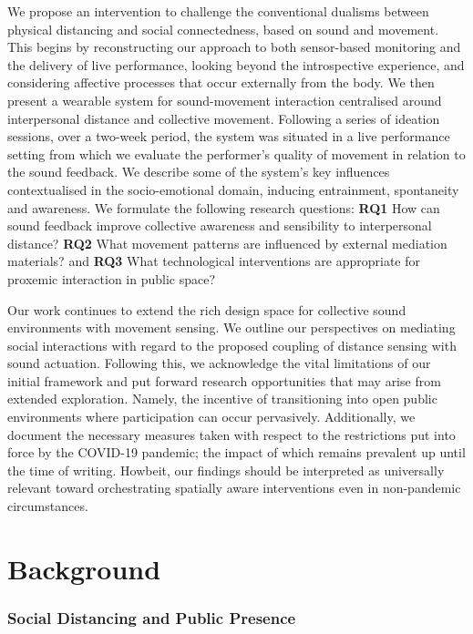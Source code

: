 We propose an intervention to challenge the conventional dualisms between physical distancing and social connectedness, based on sound and movement. This begins by reconstructing our approach to both sensor-based monitoring and the delivery of live performance, looking beyond the introspective experience, and considering affective processes that occur externally from the body. We then present a wearable system for sound-movement interaction centralised around interpersonal distance and collective movement. Following a series of ideation sessions, over a two-week period, the system was situated in a live performance setting from which we evaluate the performer's quality of movement in relation to the sound feedback. We describe some of the system’s key influences contextualised in the socio-emotional domain, inducing entrainment, spontaneity and awareness. We formulate the following research questions: \textbf{RQ1} How can sound feedback improve collective awareness and sensibility to interpersonal distance? \textbf{RQ2} What movement patterns are influenced by external mediation materials? and \textbf{RQ3} What technological interventions are appropriate for proxemic interaction in public space?

Our work continues to extend the rich design space for collective sound environments with movement sensing. We outline our perspectives on mediating social interactions with regard to the proposed coupling of distance sensing with sound actuation. Following this, we acknowledge the vital limitations of our initial framework and put forward research opportunities that may arise from extended exploration. Namely, the incentive of transitioning into open public environments where participation can occur pervasively. Additionally, we document the necessary measures taken with respect to the restrictions put into force by the COVID-19 pandemic; the impact of which remains prevalent up until the time of writing. Howbeit, our findings should be interpreted as universally relevant toward orchestrating spatially aware interventions even in non-pandemic circumstances.

\section{Background}
\label{sec2:Background}

\subsubsection{Social Distancing and Public Presence}
\label{subsec:public_space}

